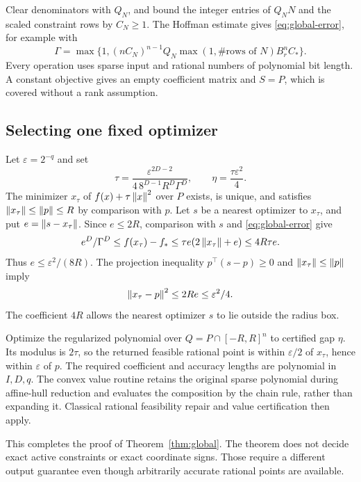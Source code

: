 Clear denominators with $Q_N$, and bound the integer entries of $Q_NN$
and the scaled constraint rows by $C_N\ge1$. The Hoffman estimate gives
\eqref{eq:global-error}, for example with
\[
 \Gamma=\max\{1,(nC_N)^{n-1}Q_N\max(1,\#\text{rows of }N)
                                      B_r^n C_*\}.
\]
Every operation uses sparse input and rational numbers of polynomial bit
length. A constant objective gives an empty coefficient matrix and $S=P$,
which is covered without a rank assumption.

\subsection{Selecting one fixed optimizer}

Let $\varepsilon=2^{-q}$ and set
\[
 \tau=\frac{\varepsilon^{2D-2}}
              {4\,8^{D-1}R^D\Gamma^D},\qquad
 \eta=\frac{\tau\varepsilon^2}{4}.
\]
The minimizer $x_\tau$ of $f(x)+\tau\left\lVert x\right\rVert^2$ over $P$ exists,
is unique, and satisfies $\left\lVert x_\tau\right\rVert\le\left\lVert p\right\rVert\le R$ by comparison
with $p$. Let $s$ be a nearest optimizer to $x_\tau$, and put
$e=\left\lVert s-x_\tau\right\rVert$. Since $e\le2R$, comparison with $s$ and
\eqref{eq:global-error} give
\[
 e^D/\Gamma^D\le f(x_\tau)-f_*
          \le\tau e(2\left\lVert x_\tau\right\rVert+e)\le4R\tau e.
\]
Thus $e\le\varepsilon^2/(8R)$. The projection inequality
$p^\top(s-p)\ge0$ and $\left\lVert x_\tau\right\rVert\le\left\lVert p\right\rVert$ imply
\[
 \left\lVert x_\tau-p\right\rVert^2\le2R e\le\varepsilon^2/4.
\]
The coefficient $4R$ allows the nearest optimizer $s$ to lie outside the
radius box.

Optimize the regularized polynomial over
$Q=P\cap[-R,R]^n$ to certified gap $\eta$. Its modulus is $2\tau$,
so the returned feasible rational point is within $\varepsilon/2$ of
$x_\tau$, hence within $\varepsilon$ of $p$. The required coefficient
and accuracy lengths are polynomial in $I,D,q$. The convex value routine
retains the original sparse polynomial during affine-hull reduction and
evaluates the composition by the chain rule, rather than expanding it.
Classical rational feasibility repair and value certification then apply.

This completes the proof of Theorem~\ref{thm:global}. The theorem does not
decide exact active constraints or exact coordinate signs. Those require a
different output guarantee even though arbitrarily accurate rational points
are available.
